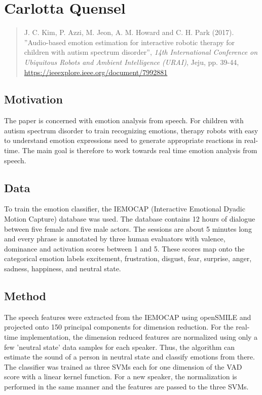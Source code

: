 \documentclass[smallheadings,english, DIV14]{scrartcl}
\begin{document}
\thispagestyle{empty}

\section*{Carlotta Quensel}
%
\begin{quote}
  J. C. Kim, P. Azzi, M. Jeon, A. M. Howard and C. H. Park (2017). ''Audio-based emotion estimation for interactive robotic therapy for children with autism spectrum disorder'', \textit{14th International Conference on Ubiquitous Robots and Ambient Intelligence (URAI)}, Jeju, pp. 39-44, \url{https://ieeexplore.ieee.org/document/7992881}
\end{quote}

\subsection*{Motivation}
The paper is concerned with emotion analysis from speech. For children with autism spectrum disorder to train recognizing emotions, therapy robots with easy to understand emotion expressions need to generate appropriate reactions in real-time. The main goal is therefore to work towards real time emotion analysis from speech.

\subsection*{Data}
To train the emotion classifier, the IEMOCAP (Interactive Emotional Dyadic Motion Capture) database was used. The database contains 12 hours of dialogue between five female and five male actors. The sessions are about 5 minutes long and every phrase is annotated by three human evaluators with valence, dominance and activation scores between 1 and 5. These scores map onto the categorical emotion labels excitement, frustration, disgust, fear, surprise, anger, sadness, happiness, and neutral state.

\subsection*{Method}
 The speech features were extracted from the IEMOCAP using openSMILE and projected onto 150 principal components for dimension reduction. For the real-time implementation, the dimension reduced features are normalized using only a few 'neutral state' data samples for each speaker. Thus, the algorithm can estimate the sound of a person in neutral state and classify emotions from there. The classifier was trained as three SVMs each for one dimension of the VAD score with a linear kernel function. For a new speaker, the normalization is performed in the same manner and the features are passed to the three SVMs.
\end{document}
